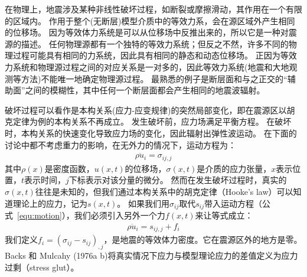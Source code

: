 在物理上，地震涉及某种非线性破坏过程，如断裂或摩擦滑动，其作用在一个有限的区域内。
作用于整个(无断层)模型介质中的等效力系，会在源区域外产生相同的位移场。
因为等效体力系统是可以从位移场中反推出来的，所以它是一种对震源的描述。
任何物理源都有一个独特的等效力系统；但反之不然，许多不同的物理过程可能具有相同的力系统，因此具有相同的静态和动态位移场。
正因为等效力系统和物理源过程之间的对应关系是一对多的，因此等效力系统(地震和大地观测等方法)不能唯一地确定物理源过程。
最熟悉的例子是断层面和与之正交的“辅助面”之间的模糊性，其中任何一个断层面都会产生相同的地震波辐射。

破坏过程可以看作是本构关系(应力-应变规律)的突然局部变化\citep{Backus1976a}，即在震源区以胡克定律为例的本构关系不再成立。
发生破坏前，应力场满足平衡方程。
在破坏时，本构关系的快速变化导致应力场的变化，因此辐射出弹性波运动。
在下面的讨论中都不考虑重力的影响，在无外力的情况下，运动方程为：
\begin{align}
    \rho \ddot u_i = \sigma_{ij,j} 
  \label{equ:motion}
\end{align}
其中$\rho(x)$是密度函数，$u(x,t)$的位移场，$\sigma(x,t)$是介质的应力张量，$x$表示位置，$t$表示时间，$j$下标表示对该分量的微分。
然而在发生破坏过程时，真实的$\sigma(x,t)$往往是未知的，但我们通过本构关系中的胡克定律（Hooke's law）可以知道理论上的应力，记为$s(x,t)$。
如果我们用$\sigma_{ij}$取代$s_{ij}$带入运动方程（公式~\ref{equ:motion}），我们必须引入另外一个力$f(x,t)$来让等式成立：
\begin{align}
    \rho \ddot u_i = s_{ij,j} + f_i
  \label{equ:f-motion}
\end{align}
我们定义$f_i = {(\sigma_{ij} - s_{ij})}_{,j}$，是地震的等效体力密度。它在震源区外的地方是零。
Backs 和 Mulcahy (1976a b)将真实情况下应力与模型理论应力的差值定义为应力过剩（stress glut）。


